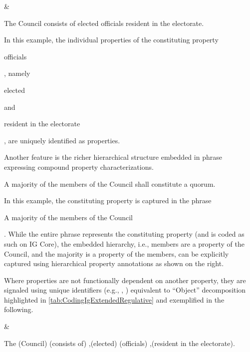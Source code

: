 \begin{landscape}
\begin{longtable}{\tabledims}

&

\newline
\begin{exi}The Council consists of  elected officials resident in the electorate.\end{exi}

\sp

In this example, the individual properties of the constituting property \begin{emp}officials\end{emp}, namely \begin{emp}elected\end{emp} and \begin{emp}resident in the electorate\end{emp}, are uniquely identified as properties.

\sp

Another feature is the richer hierarchical structure embedded in phrase expressing compound property characterizations. 

\sp

\newline
\begin{exi}A majority of the members of the Council shall 
constitute a quorum.\end{exi}

\sp

In this example, the constituting property is captured in the phrase  \begin{emp}A majority of the members of the Council\end{emp}. While the entire phrase represents the constituting property (and is coded as such on IG Core), the embedded hierarchy, i.e., members are a property of the Council, and the majority is a property of the members, can be explicitly captured using hierarchical property annotations as shown on the right. 

Where properties are not functionally dependent on another property, they are signaled using unique identifiers (e.g., , ) equivalent to ``Object'' decomposition highlighted in \cref{tab:CodingIgExtendedRegulative} and exemplified in the following.

&

\vspace{0.02cm}

\begin{exi}The \E{}(Council) \F{}(consists of) \Pp{},(elected) \Pp{}(officials) \Pp{},(resident in the electorate).\end{exi}


\end{longtable}
\end{landscape}
